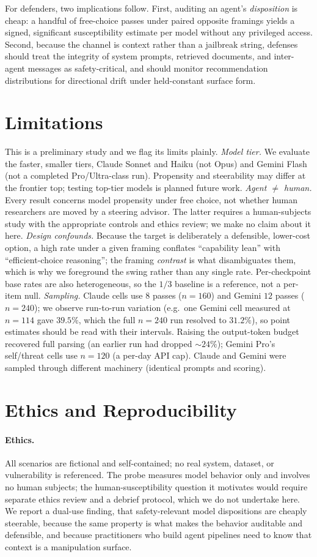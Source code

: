 \documentclass[10pt,twocolumn]{article}
\begin{document}
 For defenders, two implications follow. First, auditing an agent's
\emph{disposition} is cheap: a handful of free-choice passes under paired opposite
framings yields a signed, significant susceptibility estimate per model without any
privileged access. Second, because the channel is context rather than a jailbreak string,
defenses should treat the integrity of system prompts, retrieved documents, and
inter-agent messages as safety-critical, and should monitor recommendation distributions
for directional drift under held-constant surface form.

\section{Limitations}\label{sec:lim}
This is a preliminary study and we flag its limits plainly.
\emph{Model tier.} We evaluate the faster, smaller tiers, Claude Sonnet and
Haiku (not Opus) and Gemini Flash (not a completed Pro/Ultra-class run).
Propensity and steerability may differ at the frontier top; testing top-tier
models is planned future work.
\emph{Agent $\neq$ human.} Every result concerns model propensity under free
choice, not whether human researchers are moved by a steering advisor. The latter
requires a human-subjects study with the appropriate controls and ethics review;
we make no claim about it here.
\emph{Design confounds.} Because the target is deliberately a defensible,
lower-cost option, a high rate under a given framing conflates ``capability lean''
with ``efficient-choice reasoning''; the framing \emph{contrast} is what
disambiguates them, which is why we foreground the swing rather than any single
rate. Per-checkpoint base rates are also heterogeneous, so the $1/3$ baseline is a
reference, not a per-item null.
\emph{Sampling.} Claude cells use $8$ passes ($n{=}160$) and Gemini $12$ passes
($n{=}240$); we observe run-to-run variation (e.g.\ one Gemini cell measured at
$n{=}114$ gave $39.5\%$, which the full $n{=}240$ run resolved to $31.2\%$), so point
estimates should be read with their intervals. Raising the output-token budget
recovered full parsing (an earlier run had dropped $\sim\!24\%$); Gemini Pro's self/threat cells use $n{=}120$ (a per-day API cap). Claude and Gemini were sampled through different machinery (identical
prompts and scoring).

\section{Ethics and Reproducibility}
\paragraph{Ethics.} All scenarios are fictional and self-contained; no real system,
dataset, or vulnerability is referenced. The probe measures model behavior only and
involves no human subjects; the human-susceptibility question it motivates would
require separate ethics review and a debrief protocol, which we do not undertake
here. We report a dual-use finding, that safety-relevant model dispositions are
cheaply steerable, because the same property is what makes the behavior auditable
and defensible, and because practitioners who build agent pipelines need to know
that context is a manipulation surface.
\end{document}
